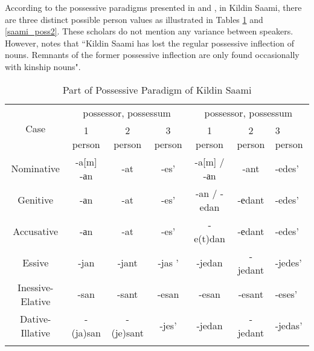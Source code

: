 According to the possessive paradigms presented in \cite{kuruch_saamsko-russkij_1985} and \cite{kert_saamskij_1971}, in Kildin Saami, there are three distinct possible person values as illustrated in Tables \ref{saami_poss1} and \ref{saami_poss2}. These scholars do not mention any variance between speakers. However, \cite{riesler_kildin_2022} notes that ``Kildin Saami has lost the regular possessive inflection of nouns. Remnants of the former possessive inflection are only found occasionally with kinship nouns".

\begin{table}[ht]
	\centering
	\begin{tabular}{ccccccl}
		\toprule
		\multicolumn{1}{c}{\multirow{2}{*}{Case}} & \multicolumn{3}{c}{\Sg{} possessor, \Sg{} possessum} & \multicolumn{3}{c}{\Pl{} possessor, \Sg{} possessum}\\
		\multicolumn{1}{c}{} & 1 person & 2 person & 3 person & 1 person & 2 person & 3 person \\\midrule
		
		Nominative & \parbox{1.5cm}{-a{[}m{]} \\ -аn} & -at & -es' & -a{[}m{]} / -аn & -ant & -edes' \\\addlinespace
		
		Genitive & -аn & -at & -es' & -an / -edan & -еdant & -edes' \\\addlinespace
		
		Accusative & -аn & -at & -es' & -e(t)dan & -еdant & -edes' \\\addlinespace
		
		Essive & -jan & -jant & -jas ' & -jedan & -jedant & -jedes' \\\addlinespace
		\parbox{2cm}{Inessive-Elative} & -san & -sant & -esan & -esan & -esant & -eses' \\\addlinespace
		
		\parbox{2cm}{Dative-Illative} & -(ja)san & -(je)sant & -jes' & -jedan & -jedant & -jedas' \\\addlinespace
		
		\bottomrule
	\end{tabular}
	\caption{Part of Possessive Paradigm of Kildin Saami}\label{saami_poss1}
\end{table}

